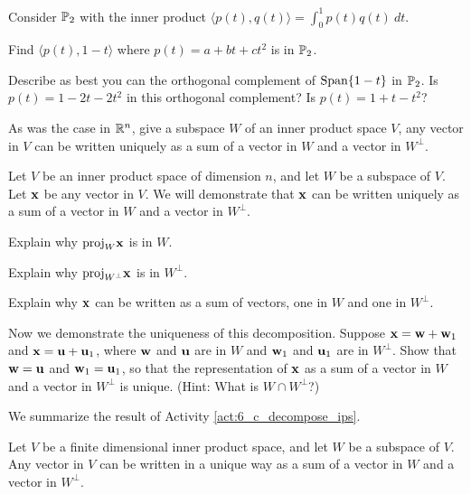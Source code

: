 \begin{activity} Consider $\mathbb{P}_2$ with the inner product $\langle p(t), q(t) \rangle = \int_0^1 p(t)q(t) \ dt$.
\ba 
\item Find $\langle p(t), 1-t \rangle$ where $p(t)=a+bt+ct^2$ is in $\mathbb{P}_2$.

\item Describe as best you can the orthogonal complement of $\text{Span}\{1-t\}$ in $\mathbb{P}_2$. Is $p(t)=1-2t-2t^2$ in this orthogonal complement? Is $p(t)=1+t-t^2$?
\ea

\end{activity}

As was the case in $\mathbb{R}^n$, give a subspace $W$ of an inner product space $V$, any vector in $V$ can be written uniquely as a sum of a vector in $W$ and a vector in $W^{\perp}$. 

\begin{activity} \label{act:6_c_decompose_ips} Let $V$ be an inner product space of dimension $n$, and let $W$ be a subspace of $V$. Let $\mathbf{x}$ be any vector in $V$. We will demonstrate that $\mathbf{x}$ can be written uniquely as a sum of a vector in $W$ and a vector in $W^{\perp}$. 
	\ba
	\item Explain why $\text{proj}_W \mathbf{x}$ is in $W$.
	
	\item Explain why $\text{proj}_{W^{\perp}} \mathbf{x}$ is in $W^{\perp}$. 

	\item Explain why $\mathbf{x}$ can be written as a sum of vectors, one in $W$ and one in $W^{\perp}$. 

	\item Now we demonstrate the uniqueness of this decomposition. Suppose $\mathbf{x} = \mathbf{w}+\mathbf{w}_1$ and $\mathbf{x} = \mathbf{u}+\mathbf{u}_1$, where $\mathbf{w}$ and $\mathbf{u}$ are in $W$ and $\mathbf{w}_1$ and $\mathbf{u}_1$ are in $W^{\perp}$. Show that $\mathbf{w}=\mathbf{u}$ and $\mathbf{w}_1 = \mathbf{u}_1$, so that the representation of $\mathbf{x}$ as a sum of a vector in $W$ and a vector in $W^{\perp}$ is unique. (Hint: What is $W \cap W^{\perp}$?)


	\ea
	
\end{activity}

We summarize the result of Activity \ref{act:6_c_decompose_ips}.

\begin{theorem} \label{thm:6_c_decompose_ips} Let $V$ be a finite dimensional inner product space, and let $W$ be a subspace of $V$. Any vector in $V$ can be written in a unique way as a sum of a vector in $W$ and a vector in $W^{\perp}$. 
\end{theorem}

